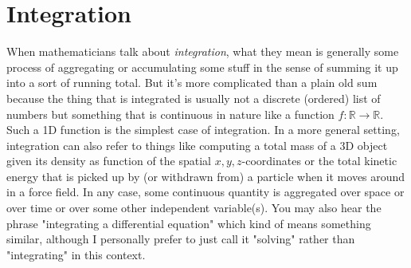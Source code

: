 \section{Integration} 
When mathematicians talk about \emph{integration}, what they mean is generally some process of aggregating or accumulating some stuff in the sense of summing it up into a sort of running total. But it's more complicated than a plain old sum because the thing that is integrated is usually not a discrete (ordered) list of numbers but something that is continuous in nature like a function $f: \mathbb{R} \rightarrow \mathbb{R}$. Such a 1D function is the simplest case of integration. In a more general setting, integration can also refer to things like computing a total mass of a 3D object given its density as function of the spatial $x,y,z$-coordinates or the total kinetic energy that is picked up by (or withdrawn from) a particle when it moves around in a force field. In any case, some continuous quantity is aggregated over space or over time or over some other independent variable(s). You may also hear the phrase "integrating a differential equation" which kind of means something similar, although I personally prefer to just call it "solving" rather than "integrating" in this context.


